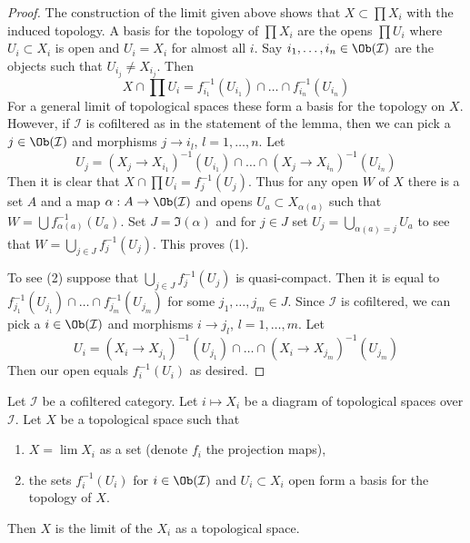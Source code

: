 \begin{proof}
The construction of the limit given above shows that $X \subset \prod X_i$
with the induced topology. A basis for the topology of $\prod X_i$ are
the opens $\prod U_i$ where $U_i \subset X_i$ is open and $U_i = X_i$
for almost all $i$. Say $i_1, \ldots, i_n \in \Ob(\mathcal{I})$ are the
objects such that $U_{i_j} \not = X_{i_j}$. Then
$$
X \cap \prod U_i = f_{i_1}^{-1}(U_{i_1}) \cap \ldots \cap f_{i_n}^{-1}(U_{i_n})
$$
For a general limit of topological spaces these form a basis for the
topology on $X$. However, if $\mathcal{I}$ is cofiltered as in the statement
of the lemma, then we can pick a $j \in \Ob(\mathcal{I})$ and morphisms
$j \to i_l$, $l = 1, \ldots, n$. Let
$$
U_j =
(X_j \to X_{i_1})^{-1}(U_{i_1}) \cap \ldots \cap
(X_j \to X_{i_n})^{-1}(U_{i_n})
$$
Then it is clear that $X \cap \prod U_i = f_j^{-1}(U_j)$. Thus for any open
$W$ of $X$ there is a set $A$ and a map $\alpha : A \to \Ob(\mathcal{I})$ and
opens $U_a \subset X_{\alpha(a)}$ such that
$W = \bigcup f_{\alpha(a)}^{-1}(U_a)$. Set $J = \Im(\alpha)$ and
for $j \in J$ set $U_j = \bigcup_{\alpha(a) = j} U_a$ to see that
$W = \bigcup_{j \in J} f_j^{-1}(U_j)$.
This proves (1).

\medskip\noindent
To see (2) suppose that $\bigcup_{j \in J} f_j^{-1}(U_j)$ is quasi-compact.
Then it is equal to
$f_{j_1}^{-1}(U_{j_1}) \cap \ldots \cap f_{j_m}^{-1}(U_{j_m})$
for some $j_1, \ldots, j_m \in J$. Since $\mathcal{I}$ is cofiltered,
we can pick a $i \in \Ob(\mathcal{I})$ and morphisms
$i \to j_l$, $l = 1, \ldots, m$. Let
$$
U_i =
(X_i \to X_{j_1})^{-1}(U_{j_1}) \cap \ldots \cap
(X_i \to X_{j_m})^{-1}(U_{j_m})
$$
Then our open equals $f_i^{-1}(U_i)$ as desired. 
\end{proof}

\begin{lemma}
\label{lemma-characterize-limit}
Let $\mathcal{I}$ be a cofiltered category. Let $i \mapsto X_i$ be a diagram
of topological spaces over $\mathcal{I}$. Let $X$ be a topological
space such that
\begin{enumerate}
\item $X = \lim X_i$ as a set (denote $f_i$ the projection maps),
\item the sets $f_i^{-1}(U_i)$ for $i \in \Ob(\mathcal{I})$ and
$U_i \subset X_i$ open form a basis for the topology of $X$.
\end{enumerate}
Then $X$ is the limit of the $X_i$ as a topological space.
\end{lemma}

